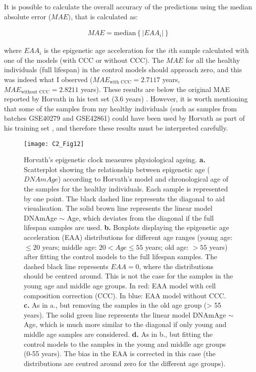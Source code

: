 It is possible to calculate the overall accuracy of the predictions using the median absolute error ($MAE)$, that is calculated as:

\begin{align}
 	MAE = \mathrm{median}\left\{|EAA_i|\right\}
\end{align}

where $EAA_i$ is the epigenetic age acceleration for the $i$th sample calculated with one of the models (with CCC or without CCC). The $MAE$ for all the healthy individuals (full lifespan) in the control models should approach zero, and this was indeed what I observed ($MAE_{\text{with CCC}} = 2.7117$ years, $MAE_{\text{without CCC}} = 2.8211$ years). These results are below the original MAE reported by Horvath in his test set (3.6 years) \cite{Horvath2013}. However, it is worth mentioning that some of the samples from my healthy individuals (such as samples from batches GSE40279 and GSE42861) could have been used by Horvath as part of his training set \cite{Horvath2013}, and therefore these results must be interpreted carefully. 

\begin{figure}[htbp!] 
	\centering
	\texttt{[image: C2\_Fig12]}
	\vspace*{2mm}    
	\caption[Horvath's epigenetic clock measures physiological ageing]{Horvath's epigenetic clock measures physiological ageing. \textbf{a.} Scatterplot showing the relationship between epigenetic age ($DNAmAge$) according to Horvath’s model \cite{Horvath2013} and chronological age of the samples for the healthy individuals. Each sample is represented by one point. The black dashed line represents the diagonal to aid visualisation. The solid brown line represents the linear model DNAmAge $\sim$ Age, which deviates from the diagonal if the full lifespan samples are used. \textbf{b.} Boxplots displaying the epigenetic age acceleration (EAA) distributions for different age ranges (young age: $\leq 20$ years; middle age: $20 < Age \leq 55$ years; old age: $> 55$ years) after fitting the control models to the full lifespan samples. The dashed black line represents $EAA = 0$, where the distributions should be centred around. This is not the case for the samples in the young age and middle age groups. In red: EAA model with cell composition correction (CCC). In blue: EAA model without CCC. \textbf{c.} As in a., but removing the samples in the old age group (> 55 years). The solid green line represents the linear model DNAmAge $\sim$ Age, which is much more similar to the diagonal if only young and middle age samples are considered. \textbf{d.} As in b., but fitting the control models to the samples in the young and middle age groups (0-55 years). The bias in the EAA is corrected in this case (the distributions are centred around zero for the different age groups).}
	\label{fig:c2_fig12}
\end{figure}   

